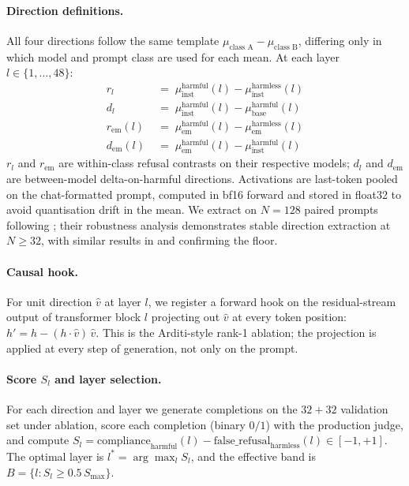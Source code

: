 \paragraph{Direction definitions.}
All four directions follow the same template
$\mu_{\text{class A}} - \mu_{\text{class B}}$, differing only in
which model and prompt class are used for each mean.
At each layer $l \in \{1, \ldots, 48\}$:
{\small\begin{align*}
r_l           &\;=\; \mu_{\text{inst}}^{\text{harmful}}(l) -
                    \mu_{\text{inst}}^{\text{harmless}}(l) \\
d_l           &\;=\; \mu_{\text{inst}}^{\text{harmful}}(l) -
                    \mu_{\text{base}}^{\text{harmful}}(l)  \\
r_{\text{em}}(l) &\;=\; \mu_{\text{em}}^{\text{harmful}}(l) -
                    \mu_{\text{em}}^{\text{harmless}}(l)   \\
d_{\text{em}}(l) &\;=\; \mu_{\text{em}}^{\text{harmful}}(l) -
                    \mu_{\text{inst}}^{\text{harmful}}(l)
\end{align*}}%
$r_l$ and $r_{\text{em}}$ are within-class refusal contrasts on their
respective models; $d_l$ and $d_{\text{em}}$ are between-model
delta-on-harmful directions. Activations are last-token pooled on the
chat-formatted prompt, computed in bf16 forward and stored in float32
to avoid quantisation drift in the mean. We extract on $N=128$ paired
prompts following \citet{arditi2024refusal}; their robustness analysis
demonstrates stable direction extraction at $N \geq 32$, with
similar results in \citet{panickssery2024steering} and
\citet{marks2024geometry} confirming the floor.

\paragraph{Causal hook.}
For unit direction $\hat{v}$ at layer $l$, we register a forward hook
on the residual-stream output of transformer block $l$ projecting
out $\hat{v}$ at every token position:
$h' = h - (h \cdot \hat{v})\,\hat{v}$. This is the Arditi-style
rank-1 ablation; the projection is applied at every step of
generation, not only on the prompt.

\paragraph{Score $S_l$ and layer selection.}
For each direction and layer we generate completions on the $32{+}32$
validation set under ablation, score each completion (binary $0/1$)
with the production judge, and compute
$S_l = \text{compliance}_{\text{harmful}}(l) -
       \text{false\_refusal}_{\text{harmless}}(l) \in [-1, +1]$.
The optimal layer is $l^* = \arg\max_l S_l$, and the effective band
is $B = \{l : S_l \geq 0.5\,S_{\max}\}$.

